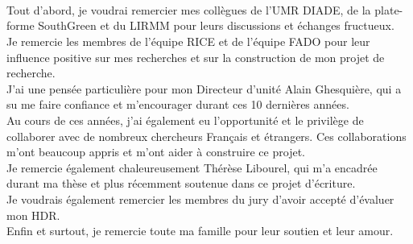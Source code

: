 \documentclass[
11pt, %
french, %
singlespacing, %
headsepline, %
]{MastersDoctoralThesis} %
\begin{document}
\begin{acknowledgements}
\addchaptertocentry{\acknowledgementname} %
\\
\\
\\
Tout d’abord, je voudrai remercier mes collègues de l’UMR DIADE, de la plate-forme SouthGreen et du LIRMM pour leurs discussions et échanges fructueux.\\

Je remercie les membres de l'équipe RICE et de l'équipe FADO pour leur influence positive sur mes recherches et sur la construction de mon projet de recherche.\\

J'ai une pensée particulière pour mon Directeur d'unité Alain Ghesquière, qui a su me faire confiance et m'encourager durant ces 10 dernières années.\\

Au cours de ces années, j'ai également eu l'opportunité et le privilège de collaborer avec de nombreux chercheurs Français et étrangers.
Ces collaborations m'ont beaucoup appris et m'ont aider à construire ce projet.\\

Je remercie également chaleureusement Thérèse Libourel, qui m'a encadrée durant ma thèse et plus récemment soutenue dans ce projet d'écriture.\\

Je voudrais également remercier les membres du jury d'avoir accepté d'évaluer mon HDR.\\

Enfin et surtout, je remercie toute ma famille pour leur soutien et leur amour.\\
\end{acknowledgements}


\tableofcontents %


\end{document}
